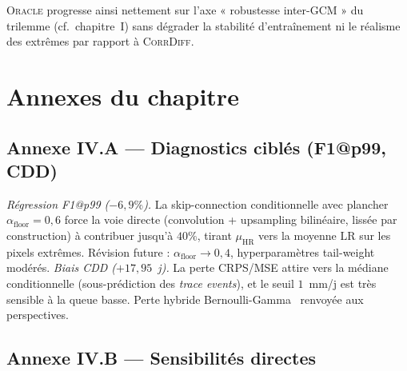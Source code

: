 \documentclass[14pt,a4paper,openany]{extreport}
\newcommand{\Oracle}{\textsc{Oracle}}
\newcommand{\CorrDiff}{\textsc{CorrDiff}}
\newcommand{\HR}{\ensuremath{\text{HR}}}
\newcommand{\LR}{\ensuremath{\text{LR}}}
\newcommand{\muHR}{\ensuremath{\mu_{\HR}}}
\begin{document}
\Oracle{} progresse ainsi nettement sur l'axe « robustesse inter-GCM » du trilemme (cf.~chapitre~I) sans dégrader la stabilité d'entraînement ni le réalisme des extrêmes par rapport à \CorrDiff{}.

\iffalse
\section*{Annexes du chapitre}

\subsection*{Annexe IV.A --- Diagnostics ciblés (F1@p99, CDD)}
\label{ssec:exp-annexe-diags}

\emph{Régression F1@p99 ($-6{,}9\%$).} La skip-connection conditionnelle avec plancher $\alpha_{\mathrm{floor}}=0{,}6$ force la voie directe (convolution + upsampling bilinéaire, lissée par construction) à contribuer jusqu'à $40\%$, tirant $\muHR$ vers la moyenne \LR{} sur les pixels extrêmes. Révision future : $\alpha_{\mathrm{floor}}\to 0{,}4$, hyperparamètres tail-weight modérés. \emph{Biais CDD ($+17{,}95$~j).} La perte CRPS/MSE attire vers la médiane conditionnelle (sous-prédiction des \emph{trace events}), et le seuil $1$~mm/j est très sensible à la queue basse. Perte hybride Bernoulli-Gamma~\cite{maraun_widmann_2018} renvoyée aux perspectives.

\subsection*{Annexe IV.B --- Sensibilités directes}
\label{ssec:exp-annexe-sens}
\end{document}
